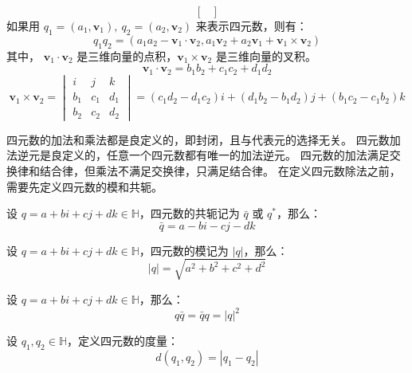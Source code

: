 \begin{definition}[四元数的乘法]
\[\begin{bmatrix}
        \end{bmatrix}
    \]
    如果用 $q_1 = (a_1, \mathbf{v}_1),\ q_2 = (a_2, \mathbf{v}_2)$ 来表示四元数，则有：
    \[
        q_1 q_2 = (a_1 a_2 - \mathbf{v}_1 \cdot \mathbf{v}_2, a_1 \mathbf{v}_2 + a_2 \mathbf{v}_1 + \mathbf{v}_1 \times \mathbf{v}_2)
    \]
    其中， $\mathbf{v}_1 \cdot \mathbf{v}_2$ 是三维向量的点积，$\mathbf{v}_1 \times \mathbf{v}_2$ 是三维向量的叉积。
    \[
        \mathbf{v}_1 \cdot \mathbf{v}_2 = b_1 b_2 + c_1 c_2 + d_1 d_2
    \]
    \[
        \mathbf{v}_1 \times \mathbf{v}_2 =
        \begin{vmatrix}
            i & j & k \\
            b_1 & c_1 & d_1 \\
            b_2 & c_2 & d_2
        \end{vmatrix}
        = (c_1 d_2 - d_1 c_2)i + (d_1 b_2 - b_1 d_2)j + (b_1 c_2 - c_1 b_2)k
    \]
    \label{def:quaternion_multiplication}
\end{definition}
\vspace{1em}
\begin{note}
    四元数的加法和乘法都是良定义的，即封闭，且与代表元的选择无关。
    四元数加法逆元是良定义的，任意一个四元数都有唯一的加法逆元。
    四元数的加法满足交换律和结合律，但乘法不满足交换律，只满足结合律。
    在定义四元数除法之前，需要先定义四元数的模和共轭。
\end{note}
\vspace{1em}

\begin{definition}
    设 $q = a + bi + cj + dk\in\mathbb{H}$，四元数的共轭记为 $\bar{q}$ 或 $q^*$，那么：
    \[
        \bar{q} = a - bi - cj - dk
    \]
\end{definition}

\begin{definition}
    设 $q = a + bi + cj + dk\in\mathbb{H}$，四元数的模记为 $|q|$，那么：
    \[
        |q| = \sqrt{a^2 + b^2 + c^2 + d^2}
    \]
\end{definition}

\begin{proposition}[四元数的共轭与模的关系]
    设 $q = a + bi + cj + dk\in\mathbb{H}$，那么：
    \[
        q \bar{q} = \bar{q} q =  |q|^2
    \]
\end{proposition}

\begin{definition}[四元数的度量]
    设 $q_1, q_2\in\mathbb{H}$，定义四元数的度量：
    \[
        d(q_1, q_2) = |q_1 - q_2|
    \]
\end{definition}

